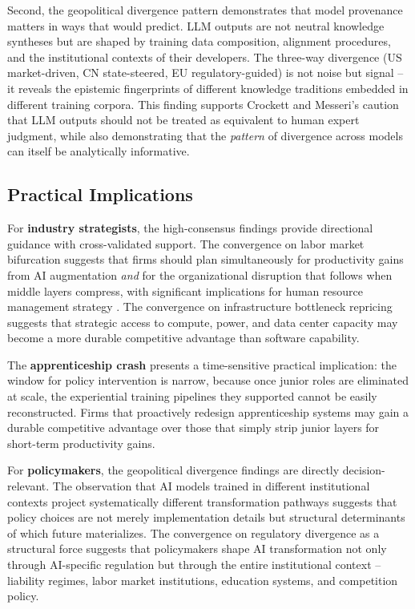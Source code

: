 \documentclass[preprint,review,12pt]{elsarticle}
\begin{document}
Second, the geopolitical divergence pattern demonstrates that model provenance matters in ways that \citet{crockett2024llmparticipants} would predict. LLM outputs are not neutral knowledge syntheses but are shaped by training data composition, alignment procedures, and the institutional contexts of their developers. The three-way divergence (US market-driven, CN state-steered, EU regulatory-guided) is not noise but signal -- it reveals the epistemic fingerprints of different knowledge traditions embedded in different training corpora. This finding supports Crockett and Messeri's caution that LLM outputs should not be treated as equivalent to human expert judgment, while also demonstrating that the \textit{pattern} of divergence across models can itself be analytically informative.


\subsection{Practical Implications}
\label{sec:practical_implications}

For \textbf{industry strategists}, the high-consensus findings provide directional guidance with cross-validated support. The convergence on labor market bifurcation suggests that firms should plan simultaneously for productivity gains from AI augmentation \textit{and} for the organizational disruption that follows when middle layers compress, with significant implications for human resource management strategy \citep{budhwar2023hrm}. The convergence on infrastructure bottleneck repricing suggests that strategic access to compute, power, and data center capacity may become a more durable competitive advantage than software capability.

The \textbf{apprenticeship crash} presents a time-sensitive practical implication: the window for policy intervention is narrow, because once junior roles are eliminated at scale, the experiential training pipelines they supported cannot be easily reconstructed. Firms that proactively redesign apprenticeship systems may gain a durable competitive advantage over those that simply strip junior layers for short-term productivity gains.

For \textbf{policymakers}, the geopolitical divergence findings are directly decision-relevant. The observation that AI models trained in different institutional contexts project systematically different transformation pathways suggests that policy choices are not merely implementation details but structural determinants of which future materializes. The convergence on regulatory divergence as a structural force suggests that policymakers shape AI transformation not only through AI-specific regulation but through the entire institutional context -- liability regimes, labor market institutions, education systems, and competition policy.
\end{document}
